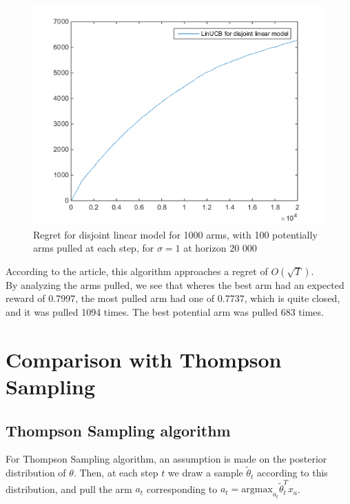 \documentclass[11pt,a4paper]{article}
\begin{document}
\begin{figure}[H]
	\centering
	\noindent\includegraphics[scale=0.5]{regret-disjoint.png}
	\caption{Regret for disjoint linear model for 1000 arms, with 100 potentially arms pulled at each step, for $\sigma = 1$ at horizon 20 000}
\end{figure}

According to the article, this algorithm approaches a regret of $O(\sqrt{T})$.\\
By analyzing the arms pulled, we see that wheres the best arm had an expected reward of 0.7997, the most pulled arm had one of 0.7737, which is quite closed, and it was pulled 1094 times. The best potential arm was pulled 683 times.



\section{Comparison with Thompson Sampling}

\subsection{Thompson Sampling algorithm}

For Thompson Sampling algorithm, an assumption is made on the posterior distribution of $\theta$. Then, at each step $t$ we draw a sample $\widetilde{\theta}_t$ according to this distribution, and pull the arm $a_t$ corresponding to $a_{t} = \mathrm{argmax}_{a_t} \widetilde{\theta}_{t}^{T} x_a$.\\
\end{document}
